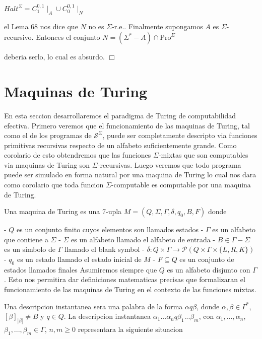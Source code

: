 \(\displaystyle Halt^{\Sigma }=C_{1}^{0,1}\mid _{A}\cup C_{0}^{0,1}\mid _{N} \)

el Lema 68 nos dice que \(N\) no es \(\Sigma \)-r.e.. Finalmente supongamos \(A\) es \(\Sigma \)-recursivo. Entonces el conjunto
\(\displaystyle N=\left( \Sigma ^{\ast }-A\right) \cap \mathrm{Pro}^{\Sigma } \)

deberia serlo, lo cual es absurdo. \(\Box\)

\section{Maquinas de Turing}


En esta seccion desarrollaremos el paradigma de Turing de computabilidad efectiva. Primero veremos que el funcionamiento de las maquinas de Turing, tal como el de los programas de \(\mathcal{S}^{\Sigma }\), puede ser completamente descripto via funciones primitivas recursivas respecto de un alfabeto suficientemente grande. Como corolario de esto obtendremos que las funciones \(\Sigma \)-mixtas que son computables via maquinas de Turing son \( \Sigma \)-recursivas. Luego veremos que todo programa puede ser simulado en forma natural por una maquina de Turing lo cual nos dara como corolario que toda funcion \(\Sigma \)-computable es computable por una maquina de Turing.

Una maquina de Turing es una 7-upla \(M=\left( Q,\Sigma ,\Gamma ,\delta ,q_{0},B,F\right) \) donde

- \(Q\) es un conjunto finito cuyos elementos son llamados estados
- \(\Gamma \) es un alfabeto que contiene a \(\Sigma \)
- \(\Sigma \) es un alfabeto llamado el alfabeto de entrada
- \(B\in \Gamma -\Sigma \) es un simbolo de \(\Gamma \) llamado el blank symbol
- \(\delta :Q\times \Gamma \rightarrow \mathcal{P}(Q\times \Gamma \times \{L,R,K\})\)
- \(q_{0}\) es un estado llamado el estado inicial de \(M\)
- \(F\subseteq Q\) es un conjunto de estados llamados finales
Asumiremos siempre que \(Q\) es un alfabeto disjunto con \(\Gamma \). Esto nos permitira dar definiciones matematicas precisas que formalizaran el funcionamiento de las maquinas de Turing en el contexto de las funciones mixtas.

Una descripcion instantanea sera una palabra de la forma \(\alpha q\beta \), donde \(\alpha ,\beta \in \Gamma ^{\ast }\), \(\left[ \beta \right] _{\left\vert \beta \right\vert }\neq B\) y \(q\in Q\). La descripcion instantanea \(\alpha _{1}...\alpha _{n}q\beta _{1}...\beta _{m}\), con \(\alpha _{1},...,\alpha _{n}\), \(\beta _{1},...,\beta _{m}\in \Gamma \), \(n,m\geq 0\) representara la siguiente situacion

